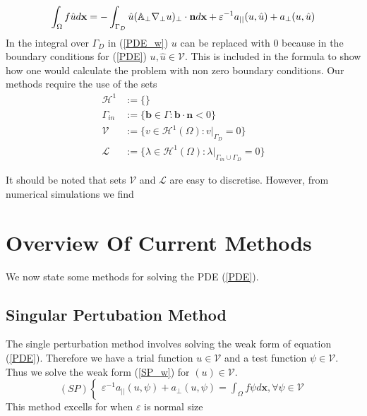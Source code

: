 \documentclass[12pt]{ociamthesis}
\begin{document}
\begin{equation} \label{PDE_w}
\int_{\Omega}f\hat{u}d\mathbf{x} = -\int_{\Gamma_D}\hat{u}(\mathbb{A}_{\perp}\nabla_{\perp} u)_{\perp}\cdot \mathbf{n} d \mathbf{x} + 
\varepsilon^{-1} a_{||}(u,\hat{u})+a_{\perp}(u, \hat{u})\\
\end{equation}
In the integral over $\Gamma_D$ in (\ref{PDE_w}) $u$ can be replaced with $0$ because in the boundary conditions for (\ref{PDE}) $u,\hat{u} \in \mathcal{V}$. This is included in the formula to show how one would calculate the problem with non zero boundary conditions.
Our methods require the use of the sets 
\begin{align}
\mathcal{H}^1 &:= \{\} \\
\Gamma_{in} &:= \{\mathbf{b} \in \Gamma : \mathbf{b} \cdot \mathbf{n} < 0\} \\
\mathcal{V} &:= \{v \in \mathcal{H}^1(\Omega) : v|_{\Gamma_{D}} = 0\} \\
\mathcal{L} &:= \{\lambda \in \mathcal{H}^1(\Omega) : \lambda |_{\Gamma_{in}\cup \Gamma_{D}} = 0\}
\end{align}

It should be noted that sets $\mathcal{V}$ and $\mathcal{L}$ are easy to discretise. However, from numerical simulations we find 

\section{Overview Of Current Methods}
 We now state some methods for solving the PDE (\ref{PDE}).
\subsection{Singular Pertubation Method} \label{SP}
The single perturbation method involves solving the weak form of equation (\ref{PDE}). Therefore we have a trial function $u \in \mathcal{V}$ and a test function $\psi \in \mathcal{V}$. Thus we solve the weak form (\ref{SP_w}) for $(u) \in \mathcal{V}$.
\begin{equation} \label{SP_w}
(SP)
\begin{cases}
\varepsilon^{-1}a_{||}(u, \psi) + a_{\perp}(u, \psi) = \int_{\Omega} f \psi d\mathbf{x}, \forall \psi \in \mathcal{V}
\end{cases}
\end{equation}
This method excells for when $\varepsilon$ is normal size
\end{document}
